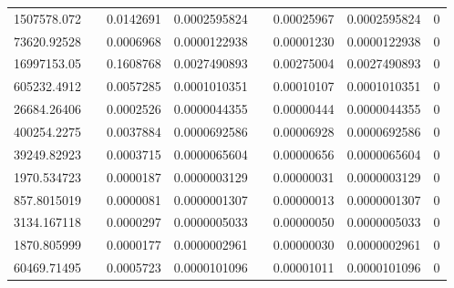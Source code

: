 \documentclass[
journal=jacsat, %
manuscript=article]{achemso}
\begin{document}
\begin{table}[htbp]
{\begin{tabular}{rrrrrrrr}
    1507578.072 &       & 0.0142691 & 0.0002595824 &       & 0.00025967 & 0.0002595824 & 0 \\
    73620.92528 &       & 0.0006968 & 0.0000122938 &       & 0.00001230 & 0.0000122938 & 0 \\
    16997153.05 &       & 0.1608768 & 0.0027490893 &       & 0.00275004 & 0.0027490893 & 0 \\
    605232.4912 &       & 0.0057285 & 0.0001010351 &       & 0.00010107 & 0.0001010351 & 0 \\
    26684.26406 &       & 0.0002526 & 0.0000044355 &       & 0.00000444 & 0.0000044355 & 0 \\
    400254.2275 &       & 0.0037884 & 0.0000692586 &       & 0.00006928 & 0.0000692586 & 0 \\
    39249.82923 &       & 0.0003715 & 0.0000065604 &       & 0.00000656 & 0.0000065604 & 0 \\
    1970.534723 &       & 0.0000187 & 0.0000003129 &       & 0.00000031 & 0.0000003129 & 0 \\
    857.8015019 &       & 0.0000081 & 0.0000001307 &       & 0.00000013 & 0.0000001307 & 0 \\
    3134.167118 &       & 0.0000297 & 0.0000005033 &       & 0.00000050 & 0.0000005033 & 0 \\
    1870.805999 &       & 0.0000177 & 0.0000002961 &       & 0.00000030 & 0.0000002961 & 0 \\
    60469.71495 &       & 0.0005723 & 0.0000101096 &       & 0.00001011 & 0.0000101096 & 0 \\
    \bottomrule
    \end{tabular}%
    }
  \label{tab:addlabel}%
\end{table}%
\end{document}
